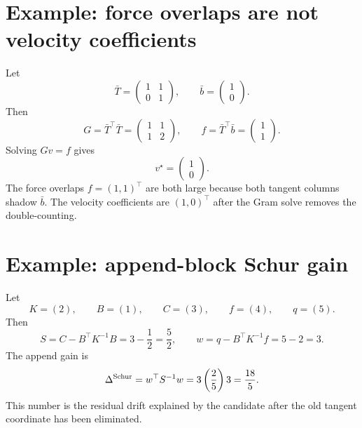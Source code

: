 \documentclass[10pt,twocolumn]{article}
\begin{document}
\section{Example: force overlaps are not velocity coefficients}

Let
\begin{equation}
\bar T=
\begin{pmatrix}
1&1\\
0&1
\end{pmatrix},
\qquad
\bar b=
\begin{pmatrix}
1\\0
\end{pmatrix}.
\end{equation}
Then
\begin{equation}
G=\bar T^\top\bar T=
\begin{pmatrix}1&1\\1&2\end{pmatrix},
\qquad
f=\bar T^\top\bar b=
\begin{pmatrix}1\\1\end{pmatrix}.
\end{equation}
Solving \(Gv=f\) gives
\begin{equation}
v^\star=\begin{pmatrix}1\\0\end{pmatrix}.
\end{equation}
The force overlaps \(f=(1,1)^\top\) are both large because both tangent columns shadow \(\bar b\). The velocity coefficients are \((1,0)^\top\) after the Gram solve removes the double-counting.

\section{Example: append-block Schur gain}

Let
\begin{equation}
K=(2),\qquad
B=(1),\qquad
C=(3),\qquad
f=(4),\qquad
q=(5).
\end{equation}
Then
\begin{equation}
S=C-B^\top K^{-1}B=3-\frac12=\frac52,
\qquad
w=q-B^\top K^{-1}f=5-2=3.
\end{equation}
The append gain is
\begin{equation}
\Delta^{\rm Schur}=w^\top S^{-1}w
=3\left(\frac{2}{5}\right)3
=\frac{18}{5}.
\end{equation}
This number is the residual drift explained by the candidate after the old tangent coordinate has been eliminated.
\end{document}
